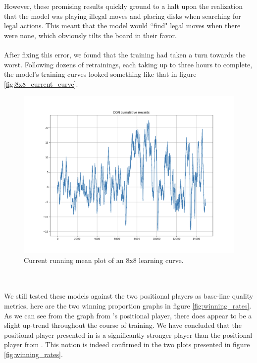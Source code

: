 \documentclass{article}
\begin{document}
\\\\
However, these promising results quickly ground to a halt upon the realization that the model was playing illegal moves and placing disks when searching for legal actions. This meant that the model would ``find" legal moves when there were none, which obviously tilts the board in their favor.
\\\\
After fixing this error, we found that the training had taken a turn towards the worst. Following dozens of retrainings, each taking up to three hours to complete, the model's training curves looked something like that in figure \ref{fig:8x8_current_curve}.
\begin{figure}[ht]
    \centering
    \includegraphics[width=0.9\linewidth]{figures/8x8_current_training_curve.png}
    \caption{\label{fig:8x8_good_curve}Current running mean plot of an 8x8 learning curve.}
\end{figure}
\\\\
We still tested these models against the two positional players as base-line quality metrics, here are the two winning proportion graphs in figure \ref{fig:winning_rates}. As we can see from the graph from \cite{codes}'s positional player, there does appear to be a slight up-trend throughout the course of training. We have concluded that the positional player presented in \cite{vanEck2008} is a significantly stronger player than the positional player from \cite{codes}. This notion is indeed confirmed in the two plots presented in figure \ref{fig:winning_rates}.
\end{document}

